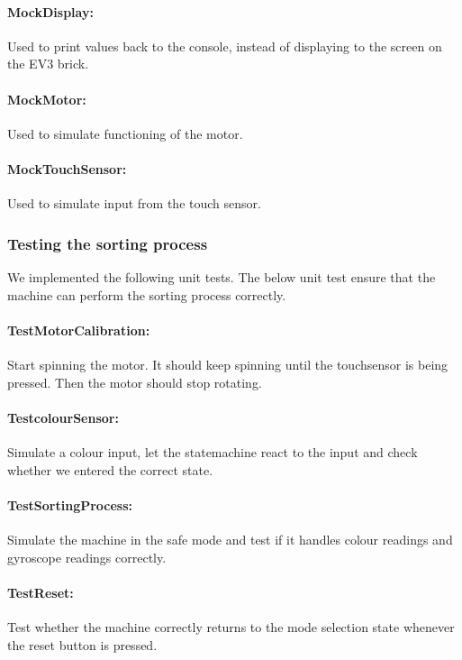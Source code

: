 \documentclass[a4paper,oneside,11pt]{article}
\begin{document}
\paragraph{MockDisplay:} Used to print values back to the console, instead of displaying to the screen on the EV3 brick.

\paragraph{MockMotor:} Used to simulate functioning of the motor.

\paragraph{MockTouchSensor:} Used to simulate input from the touch sensor. 

\subsubsection{Testing the sorting process}
We implemented the following unit tests. The below unit test ensure that the machine can perform the sorting process correctly.

\paragraph{TestMotorCalibration:} Start spinning the motor. It should keep spinning until the touchsensor is being pressed. Then the motor should stop rotating.

\paragraph{TestcolourSensor:} Simulate a colour input, let the statemachine react to the input and check whether we entered the correct state.

\paragraph{TestSortingProcess:} Simulate the machine in the safe mode and test if it handles colour readings and gyroscope readings correctly.

\paragraph{TestReset:} Test whether the machine correctly returns to the mode selection state whenever the reset button is pressed.
\end{document}
